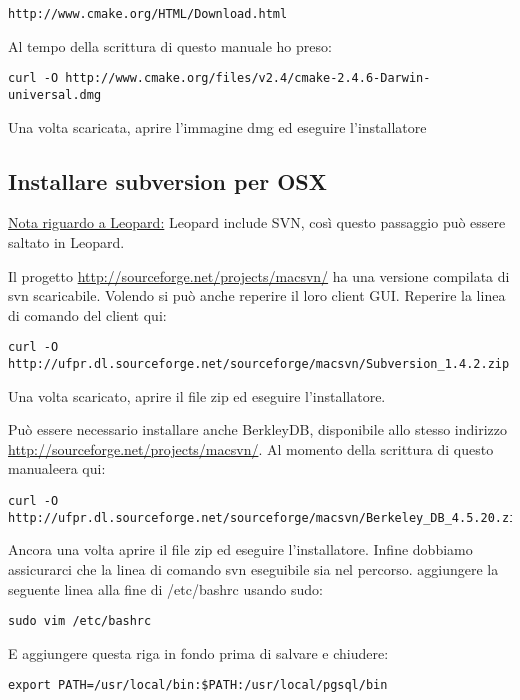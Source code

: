 \begin{verbatim}
http://www.cmake.org/HTML/Download.html 
\end{verbatim}

Al tempo della scrittura di questo manuale ho preso:

\begin{verbatim}
curl -O http://www.cmake.org/files/v2.4/cmake-2.4.6-Darwin-universal.dmg
\end{verbatim}

Una volta scaricata, aprire l'immagine dmg ed eseguire l'installatore

\subsection{Installare subversion per OSX}
\underline{Nota riguardo a Leopard:} Leopard include SVN, così questo passaggio può essere saltato in Leopard.

Il progetto \url{http://sourceforge.net/projects/macsvn/} ha una versione compilata di svn scaricabile. Volendo si può anche reperire il loro client GUI. Reperire la linea di comando del client qui:

\begin{verbatim}
curl -O http://ufpr.dl.sourceforge.net/sourceforge/macsvn/Subversion_1.4.2.zip 
\end{verbatim}

Una volta scaricato, aprire il file zip ed eseguire l'installatore.

Può essere necessario installare anche BerkleyDB, disponibile allo stesso indirizzo
\url{http://sourceforge.net/projects/macsvn/}. Al momento della scrittura di questo manualeera qui:

\begin{verbatim}
curl -O http://ufpr.dl.sourceforge.net/sourceforge/macsvn/Berkeley_DB_4.5.20.zip 
\end{verbatim}

Ancora una volta aprire il file zip ed eseguire l'installatore. Infine dobbiamo assicurarci che la linea di comando svn eseguibile sia nel percorso. aggiungere la seguente linea alla fine di /etc/bashrc usando sudo:

\begin{verbatim}
sudo vim /etc/bashrc 
\end{verbatim}

E aggiungere questa riga in fondo prima di salvare e chiudere:

\begin{verbatim}
export PATH=/usr/local/bin:$PATH:/usr/local/pgsql/bin 
\end{verbatim}

